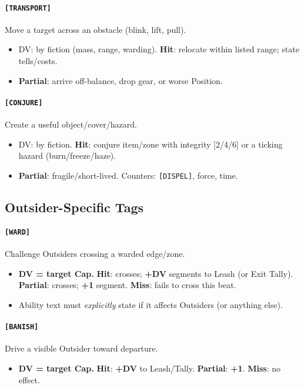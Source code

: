 \documentclass[11pt]{article}
\begin{document}
\paragraph{\texttt{[TRANSPORT]}} Move a target across an obstacle (blink, lift, pull).
\begin{itemize}
  \item DV: by fiction (mass, range, warding). \textbf{Hit}: relocate within listed range; state tells/costs.
  \item \textbf{Partial}: arrive off-balance, drop gear, or worse Position.
\end{itemize}

\paragraph{\texttt{[CONJURE]}} Create a useful object/cover/hazard.
\begin{itemize}
  \item DV: by fiction. \textbf{Hit}: conjure item/zone with integrity [2/4/6] or a ticking hazard (burn/freeze/haze).
  \item \textbf{Partial}: fragile/short-lived. Counters: \texttt{[DISPEL]}, force, time.
\end{itemize}

\subsection*{Outsider-Specific Tags}
\label{sec:tags-ward-banish}

\paragraph{\texttt{[WARD]}} Challenge Outsiders crossing a warded edge/zone.
\begin{itemize}
  \item \textbf{DV = target Cap.} \textbf{Hit}: crosses; \textbf{+DV} segments to Leash (or Exit Tally). \textbf{Partial}: crosses; \textbf{+1} segment. \textbf{Miss}: fails to cross this beat.
  \item Ability text must \emph{explicitly} state if it affects Outsiders (or anything else).
\end{itemize}

\paragraph{\texttt{[BANISH]}} Drive a visible Outsider toward departure.
\begin{itemize}
  \item \textbf{DV = target Cap.} \textbf{Hit}: \textbf{+DV} to Leash/Tally. \textbf{Partial}: \textbf{+1}. \textbf{Miss}: no effect.
\end{itemize}
\end{document}
